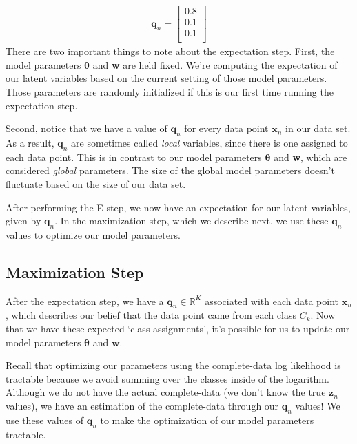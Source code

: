 \begin{align*}
    \textbf{q}_n = \begin{bmatrix}
            0.8 \\
            0.1 \\
            0.1 \\
        \end{bmatrix}
\end{align*}
There are two important things to note about the expectation step. First, the model parameters $\boldsymbol{\theta}$ and \textbf{w} are held fixed. We're computing the expectation of our latent variables based on the current setting of those model parameters. Those parameters are randomly initialized if this is our first time running the expectation step.

Second, notice that we have a value of $\textbf{q}_n$ for every data point $\textbf{x}_n$ in our data set. As a result, $\textbf{q}_n$ are sometimes called \textit{local} variables, since there is one assigned to each data point. This is in contrast to our model parameters $\boldsymbol{\theta}$ and \textbf{w}, which are considered \textit{global} parameters. The size of the global model parameters doesn't fluctuate based on the size of our data set.

After performing the E-step, we now have an expectation for our latent variables, given by $\textbf{q}_n$. In the maximization step, which we describe next, we use these $\textbf{q}_n$ values to optimize our model parameters.

\subsection{Maximization Step}
After the expectation step, we have a $\textbf{q}_n \in \mathbb{R}^K$ associated with each data point $\textbf{x}_n$, which describes our belief that the data point came from each class $C_k$. Now that we have these expected `class assignments', it's possible for us to update our model parameters $\boldsymbol{\theta}$ and $\textbf{w}$.

Recall that optimizing our parameters using the complete-data log likelihood is tractable because we avoid summing over the classes inside of the logarithm. Although we do not have the actual complete-data (we don't know the true $\textbf{z}_n$ values), we have an estimation of the complete-data through our $\textbf{q}_n$ values! We use these values of $\textbf{q}_n$ to make the optimization of our model parameters tractable.

